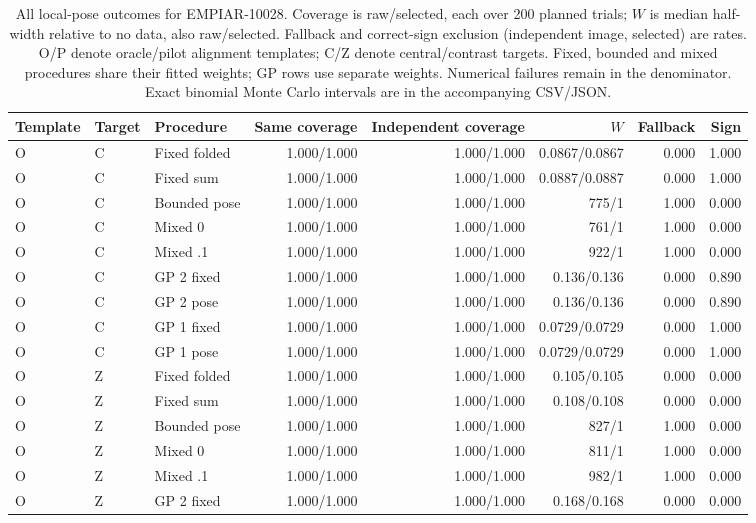 \begin{table}[!t]
\centering\footnotesize
\caption{All local-pose outcomes for EMPIAR-10028. Coverage is raw/selected, each over 200 planned trials; $W$ is median half-width relative to no data, also raw/selected. Fallback and correct-sign exclusion (independent image, selected) are rates. O/P denote oracle/pilot alignment templates; C/Z denote central/contrast targets. Fixed, bounded and mixed procedures share their fitted weights; GP rows use separate weights. Numerical failures remain in the denominator. Exact binomial Monte Carlo intervals are in the accompanying CSV/JSON.}
\begin{tabular}{lllrrrrr}
\toprule
Template & Target & Procedure & Same coverage & Independent coverage & $W$ & Fallback & Sign \\
\midrule
O & C & Fixed folded & 1.000/1.000 & 1.000/1.000 & 0.0867/0.0867 & 0.000 & 1.000 \\
O & C & Fixed sum & 1.000/1.000 & 1.000/1.000 & 0.0887/0.0887 & 0.000 & 1.000 \\
O & C & Bounded pose & 1.000/1.000 & 1.000/1.000 & 775/1 & 1.000 & 0.000 \\
O & C & Mixed 0 & 1.000/1.000 & 1.000/1.000 & 761/1 & 1.000 & 0.000 \\
O & C & Mixed .1 & 1.000/1.000 & 1.000/1.000 & 922/1 & 1.000 & 0.000 \\
O & C & GP 2 fixed & 1.000/1.000 & 1.000/1.000 & 0.136/0.136 & 0.000 & 0.890 \\
O & C & GP 2 pose & 1.000/1.000 & 1.000/1.000 & 0.136/0.136 & 0.000 & 0.890 \\
O & C & GP 1 fixed & 1.000/1.000 & 1.000/1.000 & 0.0729/0.0729 & 0.000 & 1.000 \\
O & C & GP 1 pose & 1.000/1.000 & 1.000/1.000 & 0.0729/0.0729 & 0.000 & 1.000 \\
\addlinespace
O & Z & Fixed folded & 1.000/1.000 & 1.000/1.000 & 0.105/0.105 & 0.000 & 0.000 \\
O & Z & Fixed sum & 1.000/1.000 & 1.000/1.000 & 0.108/0.108 & 0.000 & 0.000 \\
O & Z & Bounded pose & 1.000/1.000 & 1.000/1.000 & 827/1 & 1.000 & 0.000 \\
O & Z & Mixed 0 & 1.000/1.000 & 1.000/1.000 & 811/1 & 1.000 & 0.000 \\
O & Z & Mixed .1 & 1.000/1.000 & 1.000/1.000 & 982/1 & 1.000 & 0.000 \\
O & Z & GP 2 fixed & 1.000/1.000 & 1.000/1.000 & 0.168/0.168 & 0.000 & 0.000 \\

\end{tabular}
\end{table}
